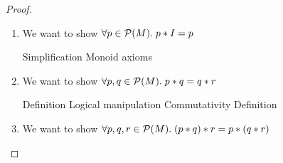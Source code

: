 \begin{proof}
\begin{enumerate}
\begin{tabbedproof}
    $\Leftarrow$ direction:\\
    \oo Assume $p \leq q \implies r$ \\
    \ooo By definition $p \subseteq q \implies r$ \\
    \ooo Assume $m \in p \cap q$ \\
    \oooo Hence $m \in p$ and $m \in q$ \\
    \oooo Since $p \subseteq q \implies r$, if $m \in p$, then if $m \in q$, then $m \in r$ \\
    \oooo Hence $m \in r$ \\
    \ooo Hence $p \cap q \subseteq r$ \\
    \ooo By definitions, $p \land q \leq r$ \\
  \end{tabbedproof}

\item We want to show $\forall p \in \mathcal{P}(M).\; p * I = p$

  \begin{eqnproof}
          {}
          {Simplification}
          {Monoid axioms}
          {}
  \end{eqnproof}

\item We want to show $\forall p, q \in \mathcal{P}(M).\; p * q = q * r$

  \begin{eqnproof}
          {Definition}
          {Logical manipulation}
          {Commutativity}
          {Definition}    
  \end{eqnproof}

\item We want to show $\forall p, q, r \in \mathcal{P}(M).\; (p * q) * r = p * (q * r)$


\end{enumerate}
\end{proof}
